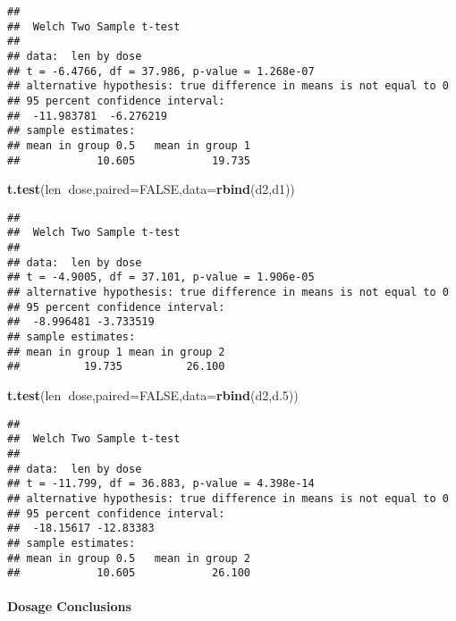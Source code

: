 \documentclass[]{article}
\newenvironment{Shaded}{\begin{snugshade}}{\end{snugshade}}
\newcommand{\KeywordTok}[1]{\textcolor[rgb]{0.13,0.29,0.53}{\textbf{#1}}}
\newcommand{\DataTypeTok}[1]{\textcolor[rgb]{0.13,0.29,0.53}{#1}}
\newcommand{\DecValTok}[1]{\textcolor[rgb]{0.00,0.00,0.81}{#1}}
\newcommand{\OtherTok}[1]{\textcolor[rgb]{0.56,0.35,0.01}{#1}}
\newcommand{\OperatorTok}[1]{\textcolor[rgb]{0.81,0.36,0.00}{\textbf{#1}}}
\newcommand{\NormalTok}[1]{#1}
\let\oldparagraph\paragraph
\renewcommand{\paragraph}[1]{\oldparagraph{#1}\mbox{}}
\begin{document}
\begin{verbatim}
## 
##  Welch Two Sample t-test
## 
## data:  len by dose
## t = -6.4766, df = 37.986, p-value = 1.268e-07
## alternative hypothesis: true difference in means is not equal to 0
## 95 percent confidence interval:
##  -11.983781  -6.276219
## sample estimates:
## mean in group 0.5   mean in group 1 
##            10.605            19.735
\end{verbatim}

\begin{Shaded}
\begin{Highlighting}[]
\KeywordTok{t.test}\NormalTok{(len}\OperatorTok{~}\NormalTok{dose,}\DataTypeTok{paired=}\OtherTok{FALSE}\NormalTok{,}\DataTypeTok{data=}\KeywordTok{rbind}\NormalTok{(d2,d1))}
\end{Highlighting}
\end{Shaded}

\begin{verbatim}
## 
##  Welch Two Sample t-test
## 
## data:  len by dose
## t = -4.9005, df = 37.101, p-value = 1.906e-05
## alternative hypothesis: true difference in means is not equal to 0
## 95 percent confidence interval:
##  -8.996481 -3.733519
## sample estimates:
## mean in group 1 mean in group 2 
##          19.735          26.100
\end{verbatim}

\begin{Shaded}
\begin{Highlighting}[]
\KeywordTok{t.test}\NormalTok{(len}\OperatorTok{~}\NormalTok{dose,}\DataTypeTok{paired=}\OtherTok{FALSE}\NormalTok{,}\DataTypeTok{data=}\KeywordTok{rbind}\NormalTok{(d2,d.}\DecValTok{5}\NormalTok{))}
\end{Highlighting}
\end{Shaded}

\begin{verbatim}
## 
##  Welch Two Sample t-test
## 
## data:  len by dose
## t = -11.799, df = 36.883, p-value = 4.398e-14
## alternative hypothesis: true difference in means is not equal to 0
## 95 percent confidence interval:
##  -18.15617 -12.83383
## sample estimates:
## mean in group 0.5   mean in group 2 
##            10.605            26.100
\end{verbatim}

\paragraph{Dosage Conclusions}\label{dosage-conclusions}
\end{document}
